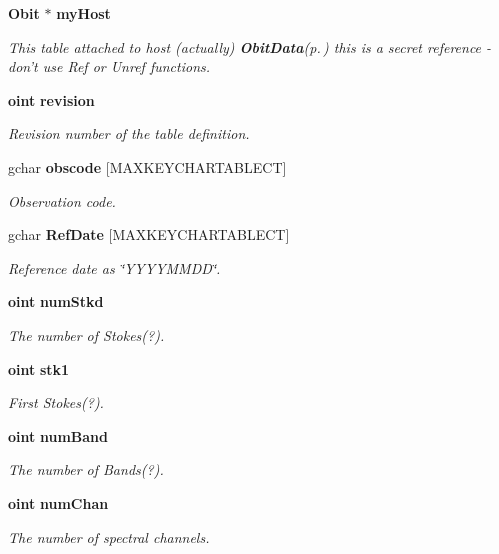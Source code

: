 \begin{CompactItemize}
{\bf Obit} $\ast$ {\bf my\-Host}
\begin{CompactList}\small\item\em This table attached to host (actually) {\bf Obit\-Data}{\rm (p.\,\pageref{structObitData})} this is a secret reference - don't use Ref or Unref functions. \item\end{CompactList}\item 
{\bf oint} {\bf revision}
\begin{CompactList}\small\item\em Revision number of the table definition. \item\end{CompactList}\item 
gchar {\bf obscode} [MAXKEYCHARTABLECT]
\begin{CompactList}\small\item\em Observation code. \item\end{CompactList}\item 
gchar {\bf Ref\-Date} [MAXKEYCHARTABLECT]
\begin{CompactList}\small\item\em Reference date as \char`\"{}YYYYMMDD\char`\"{}. \item\end{CompactList}\item 
{\bf oint} {\bf num\-Stkd}
\begin{CompactList}\small\item\em The number of Stokes(?). \item\end{CompactList}\item 
{\bf oint} {\bf stk1}
\begin{CompactList}\small\item\em First Stokes(?). \item\end{CompactList}\item 
{\bf oint} {\bf num\-Band}
\begin{CompactList}\small\item\em The number of Bands(?). \item\end{CompactList}\item 
{\bf oint} {\bf num\-Chan}
\begin{CompactList}\small\item\em The number of spectral channels. \item\end{CompactList}\item 

\end{CompactItemize}
